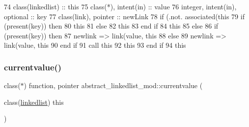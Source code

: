 \begin{DoxyCode}
74     \textcolor{keywordtype}{class}(linkedlist) :: this
75     \textcolor{keywordtype}{class}(*), \textcolor{keywordtype}{intent(in)} :: value
76     \textcolor{keywordtype}{integer}, \textcolor{keywordtype}{intent(in)}, \textcolor{keywordtype}{optional} :: key
77     \textcolor{keywordtype}{class}(link), \textcolor{keywordtype}{pointer} :: newLink
78     \textcolor{keywordflow}{if} (.not. \textcolor{keyword}{associated}(this%
79         \textcolor{keywordflow}{if} (\textcolor{keyword}{present}(key)) \textcolor{keywordflow}{then}
80             this%
81         \textcolor{keywordflow}{else}
82             this%
83 \textcolor{keywordflow}{        end if}
84         this%
85     \textcolor{keywordflow}{else}
86         \textcolor{keywordflow}{if} (\textcolor{keyword}{present}(key)) \textcolor{keywordflow}{then}
87             newlink => link(\textcolor{keywordtype}{value}, this%
88         \textcolor{keywordflow}{else}
89             newlink => link(\textcolor{keywordtype}{value}, this%
90 \textcolor{keywordflow}{        end if}
91         \textcolor{keyword}{call }this%
92         this%
93 \textcolor{keywordflow}{    end if}
94     this%
\end{DoxyCode}
\mbox{\label{namespaceabstract__linkedlist__mod_a87a81a4be29c8d4e8d2fb0d02247033b}} 
\subsubsection{\texorpdfstring{currentvalue()}{currentvalue()}}
{\footnotesize\ttfamily class($\ast$) function, pointer abstract\+\_\+linkedlist\+\_\+mod\+::currentvalue (\begin{DoxyParamCaption}\item[{class(\mbox{\hyperlink{structabstract__linkedlist__mod_1_1linkedlist}{linkedlist}})}]{this }\end{DoxyParamCaption})\hspace{0.3cm}{\ttfamily [private]}}



